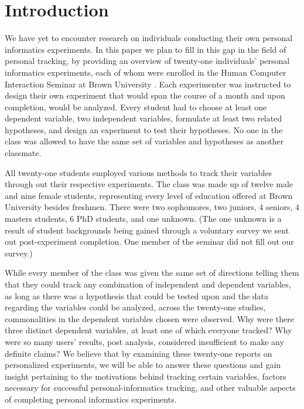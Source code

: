 \section{Introduction}
We have yet to encounter research on individuals conducting their own personal informatics experiments.  In this paper we plan to fill in this gap in the field of personal tracking, by providing an overview of twenty-one individuals' personal informatics experiments, each of whom were enrolled in the Human Computer Interaction Seminar at Brown University .  Each experimenter was instructed to design their own experiment that would span the course of a month and upon completion, would be analyzed.  Every student had to choose at least one dependent variable, two independent variables, formulate at least two related hypotheses, and design an experiment to test their hypotheses. No one in the class was allowed to have the same set of variables and hypotheses as another classmate.  

All twenty-one students employed various methods to track their variables through out their respective experiments.  The class was made up of twelve male and nine female students, representing every level of education offered at Brown University besides freshmen.  There were two sophomores, two juniors, 4 seniors, 4 masters students, 6 PhD students, and one unknown. (The one unknown is a result of student backgrounds being gained through a voluntary survey we sent out post-experiment completion. One member of the seminar did not fill out our survey.) 

While every member of the class was given the same set of directions telling them that they could track any combination of independent and dependent variables, as long as there was a hypothesis that could be tested upon and the data regarding the variables could be analyzed, across the twenty-one studies, commonalities in the dependent variables chosen were observed.  Why were there three distinct dependent variables, at least one of which everyone tracked?  Why were so many users' results, post analysis, considered insufficient to make any definite claims?  We believe that by examining these twenty-one reports on personalized experiments, we will be able to answer these questions and gain insight pertaining to the motivations behind tracking certain variables, factors necessary for successful personal-informatics tracking, and other valuable aspects of completing personal informatics experiments. 